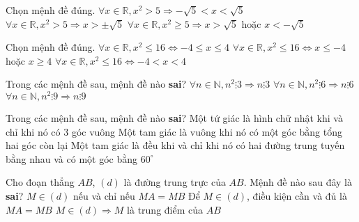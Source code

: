 \begin{ex}%
	Chọn mệnh đề đúng.
	{$\forall x\in\mathbb{R}, x^2>5\Rightarrow -\sqrt{5}<x<\sqrt{5}$}
	{$\forall x\in\mathbb{R}, x^2>5\Rightarrow x>\pm\sqrt{5}$}
	{$\forall x\in\mathbb{R}, x^2\ge5\Rightarrow x> \sqrt{5}$ hoặc $x< -\sqrt{5}$}
\end{ex}
\begin{ex}%
	Chọn mệnh đề đúng.
	{\True $\forall x\in\mathbb{R}, x^2\leq 16\Leftrightarrow -4\leq x\leq 4$}
	{$\forall x\in\mathbb{R}, x^2\leq 16\Leftrightarrow x\leq -4$ hoặc $x\geq 4$}
	{$\forall x\in\mathbb{R}, x^2\leq 16\Leftrightarrow -4<x<4$}
\end{ex}
\begin{ex}%
	Trong các mệnh đề sau, mệnh đề nào \textbf{sai}?
	{$\forall n\in\mathbb{N}, n^2 \vdots 3\Rightarrow n \vdots 3$}
	{$\forall n\in\mathbb{N}, n^2 \vdots 6\Rightarrow n \vdots 6$}
	{\True $\forall n\in\mathbb{N}, n^2 \vdots 9\Rightarrow n \vdots 9$}
\end{ex}
\begin{ex}%
	Trong các mệnh đề sau, mệnh đề nào \textbf{sai}?
	{Một tứ giác là hình chữ nhật khi và chỉ khi nó có $3$ góc vuông}
	{Một tam giác là vuông khi nó có một góc bằng tổng hai góc còn lại}
	{Một tam giác là đều khi và chỉ khi nó có hai đường trung tuyến bằng nhau và có một góc bằng $60^{\circ}$}
\end{ex}
\begin{ex}%
	Cho đoạn thẳng $AB$, $\left( d\right)$ là đường trung trực của $AB$. Mệnh đề nào sau đây là \textbf{sai}?
	{$M\in \left( d\right)$ nếu và chỉ nếu $MA=MB$}
	{Để $M\in \left( d\right)$, điều kiện cần và đủ là $MA=MB$}
	{\True $M\in \left(d\right) \Rightarrow M$ là trung điểm của $AB$}
\end{ex}

